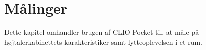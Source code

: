 \chapter{Målinger}
\label{chapt:Maal}
Dette kapitel omhandler brugen af CLIO Pocket til, at måle på højtalerkabinettets karakteristiker samt lytteoplevelsen i et rum.



